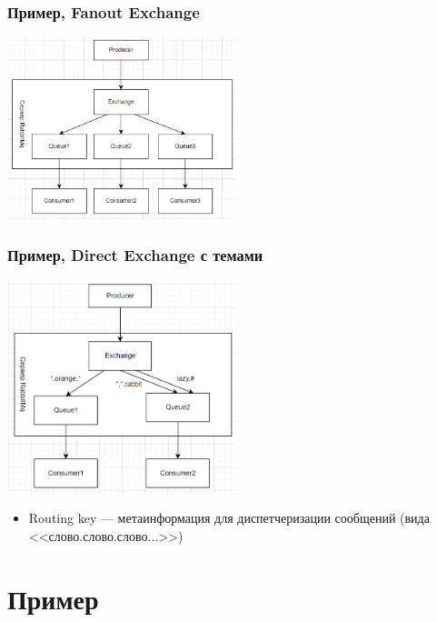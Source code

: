 \documentclass[xetex,mathserif,serif]{beamer}
\begin{document}
    \begin{frame}
        \frametitle{Пример, Fanout Exchange}
        \begin{center}
            \includegraphics[width=0.5\textwidth]{fanoutExchange.png}
        \end{center}
    \end{frame}

    \begin{frame}
        \frametitle{Пример, Direct Exchange с темами}
        \begin{center}
            \includegraphics[width=0.5\textwidth]{topicExchange.png}
        \end{center}
        \begin{itemize}
            \item Routing key --- метаинформация для диспетчеризации сообщений (вида <<слово.слово.слово...>>)
        \end{itemize}
    \end{frame}

    \section{Пример}
\end{document}
